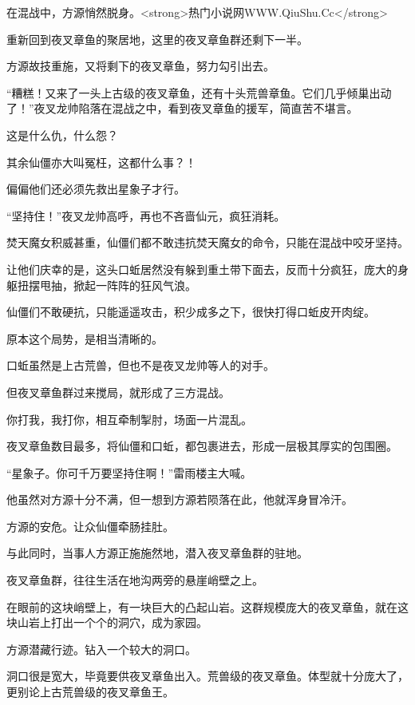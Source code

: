 
\begin{this_body}

在混战中，方源悄然脱身。<strong>热门小说网WWW.QiuShu.Cc</strong>

重新回到夜叉章鱼的聚居地，这里的夜叉章鱼群还剩下一半。

方源故技重施，又将剩下的夜叉章鱼，努力勾引出去。

“糟糕！又来了一头上古级的夜叉章鱼，还有十头荒兽章鱼。它们几乎倾巢出动了！”夜叉龙帅陷落在混战之中，看到夜叉章鱼的援军，简直苦不堪言。

这是什么仇，什么怨？

其余仙僵亦大叫冤枉，这都什么事？！

偏偏他们还必须先救出星象子才行。

“坚持住！”夜叉龙帅高呼，再也不吝啬仙元，疯狂消耗。

焚天魔女积威甚重，仙僵们都不敢违抗焚天魔女的命令，只能在混战中咬牙坚持。

让他们庆幸的是，这头口蚯居然没有躲到重土带下面去，反而十分疯狂，庞大的身躯扭摆甩抽，掀起一阵阵的狂风气浪。

仙僵们不敢硬抗，只能遥遥攻击，积少成多之下，很快打得口蚯皮开肉绽。

原本这个局势，是相当清晰的。

口蚯虽然是上古荒兽，但也不是夜叉龙帅等人的对手。

但夜叉章鱼群过来搅局，就形成了三方混战。

你打我，我打你，相互牵制掣肘，场面一片混乱。

夜叉章鱼数目最多，将仙僵和口蚯，都包裹进去，形成一层极其厚实的包围圈。

“星象子。你可千万要坚持住啊！”雷雨楼主大喊。

他虽然对方源十分不满，但一想到方源若陨落在此，他就浑身冒冷汗。

方源的安危。让众仙僵牵肠挂肚。

与此同时，当事人方源正施施然地，潜入夜叉章鱼群的驻地。

夜叉章鱼群，往往生活在地沟两旁的悬崖峭壁之上。

在眼前的这块峭壁上，有一块巨大的凸起山岩。这群规模庞大的夜叉章鱼，就在这块山岩上打出一个个的洞穴，成为家园。

方源潜藏行迹。钻入一个较大的洞口。

洞口很是宽大，毕竟要供夜叉章鱼出入。荒兽级的夜叉章鱼。体型就十分庞大了，更别论上古荒兽级的夜叉章鱼王。


\end{this_body}
